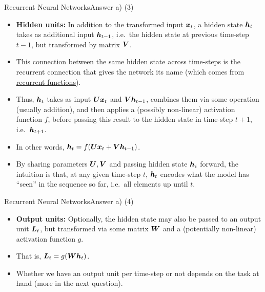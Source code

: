\documentclass[t]{beamer}
\begin{document}
\begin{frame}{Recurrent Neural Networks}{Answer a) (3)}
    \begin{itemize}
        \item \textbf{Hidden units:} In addition to the transformed input
              ${\boldsymbol{x}}_t$, a hidden state ${\boldsymbol{h}}_t$ takes as additional input
              ${\boldsymbol{h}}_{t-1}$, i.e.\ the hidden state at previous time-step $t-1$,
              but transformed by matrix ${\boldsymbol{V}}$.
        \item This connection between the same hidden state across time-steps is
              the recurrent connection that gives the network its name (which
              comes from
              \href{https://en.wikipedia.org/wiki/Recurrence_relation}{\underline{recurrent functions}}).
        \item Thus, ${\boldsymbol{h}}_{t}$ takes as input ${\boldsymbol{U}}{\boldsymbol{x}}_t$ and ${\boldsymbol{V}}{\boldsymbol{h}}_{t-1}$,
              combines them via some operation (usually addition), and then
              applies a (possibly non-linear) activation function $f$, before
              passing this result to the hidden state in time-step $t+1$, i.e.\
              ${\boldsymbol{h}}_{t+1}$.
        \item In other words, ${\boldsymbol{h}}_t = f({\boldsymbol{U}}{\boldsymbol{x}}_t + {\boldsymbol{V}}{\boldsymbol{h}}_{t-1})$.
        \item By sharing parameters ${\boldsymbol{U}},{\boldsymbol{V}}$ and passing hidden state ${\boldsymbol{h}}_i$
              forward, the intuition is that, at any given time-step $t$,
              ${\boldsymbol{h}}_{t}$ encodes what the model has ``seen'' in the sequence so
              far, i.e.\ all elements up until $t$.
    \end{itemize}
\end{frame}

\begin{frame}{Recurrent Neural Networks}{Answer a) (4)}
    \begin{itemize}
        \item \textbf{Output units:} Optionally, the hidden state may also be
              passed to an output unit ${\boldsymbol{L}}_t$, but transformed via some matrix
              ${\boldsymbol{W}}$ and a (potentially non-linear) activation function $g$.
        \item That is, ${\boldsymbol{L}}_t = g({\boldsymbol{W}}{\boldsymbol{h}}_t)$.
        \item Whether we have an output unit per time-step or not depends on the
              task at hand (more in the next question).
    \end{itemize}
\end{frame}
\end{document}
